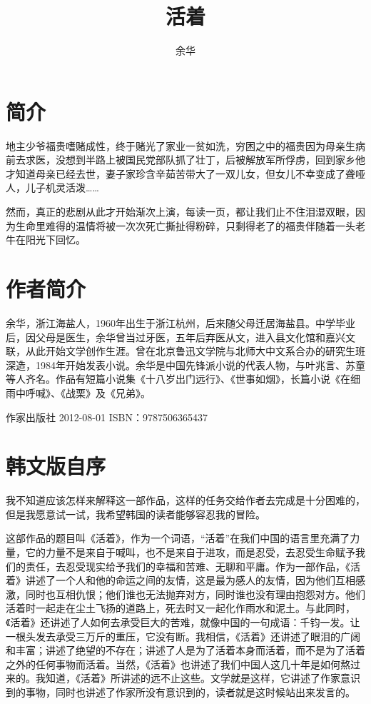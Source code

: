 \documentclass[12pt,UTF8]{ctexbook}
\title{\heiti\zihao{0} 活着}
\author{余华}
\date{}
\begin{document}
\maketitle
\tableofcontents

\frontmatter

\chapter{简介}

地主少爷福贵嗜赌成性，终于赌光了家业一贫如洗，穷困之中的福贵因为母亲生病前去求医，没想到半路上被国民党部队抓了壮丁，后被解放军所俘虏，回到家乡他才知道母亲已经去世，妻子家珍含辛茹苦带大了一双儿女，但女儿不幸变成了聋哑人，儿子机灵活泼……

然而，真正的悲剧从此才开始渐次上演，每读一页，都让我们止不住泪湿双眼，因为生命里难得的温情将被一次次死亡撕扯得粉碎，只剩得老了的福贵伴随着一头老牛在阳光下回忆。

\chapter{作者简介}

余华，浙江海盐人，1960年出生于浙江杭州，后来随父母迁居海盐县。中学毕业后，因父母是医生，余华曾当过牙医，五年后弃医从文，进入县文化馆和嘉兴文联，从此开始文学创作生涯。曾在北京鲁迅文学院与北师大中文系合办的研究生班深造，1984年开始发表小说。余华是中国先锋派小说的代表人物，与叶兆言、苏童等人齐名。作品有短篇小说集《十八岁出门远行》、《世事如烟》，长篇小说《在细雨中呼喊》、《战栗》及《兄弟》。

作家出版社	2012-08-01	ISBN：9787506365437

\chapter{韩文版自序}

我不知道应该怎样来解释这一部作品，这样的任务交给作者去完成是十分困难的，但是我愿意试一试，我希望韩国的读者能够容忍我的冒险。

这部作品的题目叫《活着》，作为一个词语，“活着”在我们中国的语言里充满了力量，它的力量不是来自于喊叫，也不是来自于进攻，而是忍受，去忍受生命赋予我们的责任，去忍受现实给予我们的幸福和苦难、无聊和平庸。作为一部作品，《活着》讲述了一个人和他的命运之间的友情，这是最为感人的友情，因为他们互相感激，同时也互相仇恨；他们谁也无法抛弃对方，同时谁也没有理由抱怨对方。他们活着时一起走在尘土飞扬的道路上，死去时又一起化作雨水和泥土。与此同时，《活着》还讲述了人如何去承受巨大的苦难，就像中国的一句成语：千钧一发。让一根头发去承受三万斤的重压，它没有断。我相信，《活着》还讲述了眼泪的广阔和丰富；讲述了绝望的不存在；讲述了人是为了活着本身而活着，而不是为了活着之外的任何事物而活着。当然，《活着》也讲述了我们中国人这几十年是如何熬过来的。我知道，《活着》所讲述的远不止这些。文学就是这样，它讲述了作家意识到的事物，同时也讲述了作家所没有意识到的，读者就是这时候站出来发言的。
~\\
\end{document}
